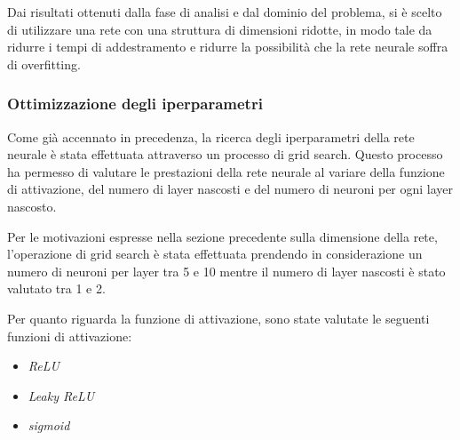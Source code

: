 Dai risultati ottenuti dalla fase di analisi e dal dominio del problema, si è
scelto di utilizzare una rete con una struttura di dimensioni ridotte, in modo
tale da ridurre i tempi di addestramento e ridurre la possibilità che la rete
neurale soffra di overfitting.

\subsubsection{Ottimizzazione degli iperparametri}
Come già accennato in precedenza, la ricerca degli iperparametri della rete neurale
è stata effettuata attraverso un processo di grid search. Questo processo ha
permesso di valutare le prestazioni della rete neurale al variare della funzione
di attivazione, del numero di layer nascosti e del numero di neuroni per ogni
layer nascosto.

Per le motivazioni espresse nella sezione precedente sulla dimensione della rete,
l'operazione di grid search è
stata effettuata prendendo in considerazione un numero di neuroni per layer
tra 5 e 10 mentre il numero di layer nascosti è stato valutato tra 1 e 2.

Per quanto riguarda la funzione di attivazione, sono state valutate le seguenti
funzioni di attivazione:
\begin{itemize}
    \item \textit{ReLU}
    \item \textit{Leaky ReLU}
    \item \textit{sigmoid}
\end{itemize}

